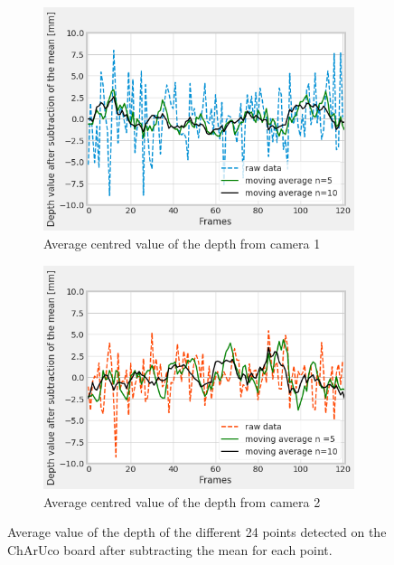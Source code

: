 \begin{figure}[H]
\centering
  \begin{subfigure}[b]{0.48 \textwidth}
    \includegraphics[width=\textwidth]{images/visual_enhancement/master_depth_frame_serie_moving_average.png}
    \caption{Average centred value of the depth from camera 1}
    \label{figure:master_depth_frame_serie_moving_average}
  \end{subfigure}
  \hfill
  \begin{subfigure}[b]{0.48 \textwidth}
    \includegraphics[width=\textwidth]{images/visual_enhancement/sub_depth_frame_serie_moving_average.png}
    \caption{Average centred value of the depth from camera 2}
    \label{figure:sub_depth_frame_serie_moving_average}
  \end{subfigure}
  \caption{Average value of the depth of the different 24 points detected on the ChArUco board after subtracting the mean for each point.}
  \label{figure:frame_serie_moving_avarage}
\end{figure}



